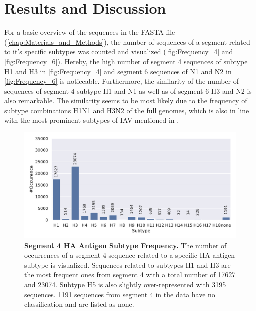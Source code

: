 \chapter{Results and Discussion} \label{chap:Results_and_Discussion}

For a basic overview of the sequences in the FASTA file (\autoref{chap:Materials_and_Methods}), the number of sequences of a segment related to it's specific subtypes was counted and visualized (\autoref{fig:Frequency_4} and \autoref{fig:Frequency_6}). Hereby, the high number of segment 4 sequences of subtype H1 and H3 in \autoref{fig:Frequency_4} and segment 6 sequences of N1 and N2 in \autoref{fig:Frequency_6} is noticeable. Furthermore, the similarity of the number of sequences of segment 4 subtype H1 and N1 as well as of segment 6 H3 and N2 is also remarkable. The similarity seems to be most likely due to the frequency of subtype combinations H1N1 and H3N2 of the full genomes, which is also in line with the most prominent subtypes of \gls{IAV} mentioned in \textcite{deng_simplified_2015}. 

\begin{figure}[!hbt]
    \centering
    \includegraphics[width=\textwidth]{PCA/Data_Overview_Segment_4_H.pdf}
    \caption[Segment 4 \Acrlong{HA} Antigen Subtype Frequency]{\textbf{Segment 4 \Acrlong{HA} Antigen Subtype Frequency.} The number of occurrences of a segment 4 sequence related to a specific \gls{HA} antigen subtype is visualized. Sequences related to subtypes H1 and H3 are the most frequent ones from segment 4 with a total number of 17627 and 23074. Subtype H5 is also slightly over-represented with 3195 sequences. 1191 sequences from segment 4 in the data have no classification and are listed as \glqq none\grqq{}.}
    \label{fig:Frequency_4}
\end{figure}

